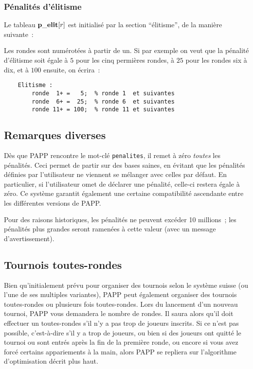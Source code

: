 \documentclass[10pt]{article}
\begin{document}
\subsubsection{Pénalités d'élitisme}

Le tableau ${\bf p\_elit}[r]$ est initialisé par la section
``élitisme'', de la manière suivante~:

\medbreak
{}
\medbreak


Les rondes sont numérotées à partir de un.  Si par exemple on 
veut que la pénalité d'élitisme soit égale à $5$ pour les 
cinq permières rondes, à $25$ pour les rondes six à dix, et à 
$100$ ensuite, on écrira~:
\begin{verbatim}
    Elitisme :
        ronde  1+ =   5;  % ronde 1  et suivantes
        ronde  6+ =  25;  % ronde 6  et suivantes
        ronde 11+ = 100;  % ronde 11 et suivantes
\end{verbatim}

\subsection{Remarques diverses}

	Dès que PAPP rencontre le mot-clé \verb|penalites|, il remet
à zéro {\em toutes\/} les pénalités. Ceci permet de partir sur
des bases saines, en évitant que les pénalités définies par
l'utilisateur ne viennent se mélanger avec celles par défaut. En
particulier, si l'utilisateur omet de déclarer une pénalité,
celle-ci restera égale à zéro. Ce système garantit également une
certaine compatibilité ascendante entre les différentes versions de
PAPP.

	Pour des raisons historiques, les pénalités ne peuvent
excéder 10 millions~; les pénalités plus grandes seront ramenées
à cette valeur (avec un message d'avertissement).

\subsection{Tournois toutes-rondes}
 
	Bien qu'initialement prévu pour organiser des tournois selon
le système suis\-se (ou l'une de ses multiples variantes), PAPP peut
également organiser des tournois toutes-rondes ou plusieurs fois
toutes-rondes. Lors du lancement d'un nouveau tournoi, PAPP vous demandera le nombre de rondes.
Il saura alors qu'il doit effectuer un toutes-rondes s'il n'y a pas trop de joueurs inscrits.
Si ce n'est pas possible, c'est-à-dire s'il y a trop
de joueurs, ou bien si des joueurs ont quitté le tournoi ou sont
entrés après la fin de la première ronde, ou encore si vous avez
forcé certains appariements à la main, alors PAPP se repliera sur
l'algorithme d'optimisation décrit plus haut. 
\end{document}

